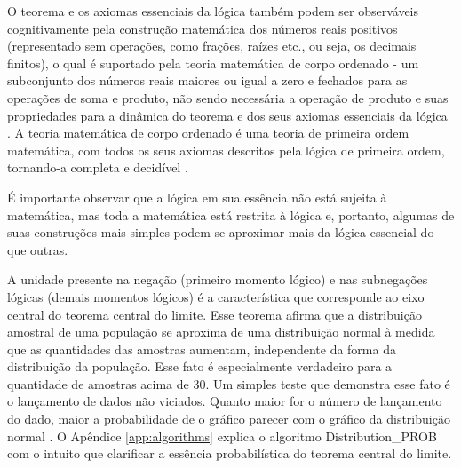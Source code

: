 O teorema e os axiomas essenciais da lógica também podem ser observáveis cognitivamente pela construção matemática dos números reais positivos (representado sem operações, como frações, raízes etc., ou seja, os decimais finitos), o qual é suportado pela teoria matemática de corpo ordenado - um subconjunto dos números reais maiores ou igual a zero e fechados para as operações de soma e produto, não sendo necessária a operação de produto e suas propriedades para a dinâmica do teorema e dos seus axiomas essenciais da lógica \cite{wiki_ordered_field}. A teoria matemática de corpo ordenado é uma teoria de primeira ordem matemática, com todos os seus axiomas descritos pela lógica de primeira ordem, tornando-a completa e decidível \cite{wiki_RealClosedField}. 

É importante observar que a lógica em sua essência não está sujeita à matemática, mas toda a matemática está restrita à lógica e, portanto, algumas de suas construções mais simples podem se aproximar mais da lógica essencial do que outras.

A unidade presente na negação (primeiro momento lógico) e nas subnegações lógicas (demais momentos lógicos) é a característica que corresponde ao eixo central do teorema central do limite. Esse teorema afirma que a distribuição amostral de uma população se aproxima de uma distribuição normal à medida que as quantidades das amostras aumentam, independente da forma da distribuição da população. Esse fato é especialmente verdadeiro para a quantidade de amostras acima de 30. Um simples teste que demonstra esse fato é o lançamento de dados não viciados. Quanto maior for o número de lançamento do dado, maior a probabilidade de o gráfico parecer com o gráfico da distribuição normal \cite{statisticshowto_central_limit_theorem}. O Apêndice \ref{app:algorithms} explica o algoritmo Distribution\_PROB com o intuito que clarificar a essência probabilística do teorema central do limite.

